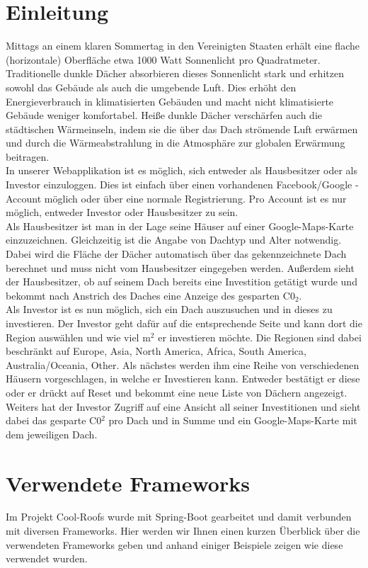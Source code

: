 \documentclass[12pt,a4paper]{article}
\begin{document}
\section{Einleitung} 
Mittags an einem klaren Sommertag in den Vereinigten Staaten erhält eine flache (horizontale) Oberfläche etwa 1000 Watt Sonnenlicht pro Quadratmeter. Traditionelle dunkle Dächer absorbieren dieses Sonnenlicht stark und erhitzen sowohl das Gebäude als auch die umgebende Luft. Dies erhöht den Energieverbrauch in klimatisierten Gebäuden und macht nicht klimatisierte Gebäude weniger komfortabel. Heiße dunkle Dächer verschärfen auch die städtischen Wärmeinseln, indem sie die über das Dach strömende Luft erwärmen und durch die Wärmeabstrahlung in die Atmosphäre zur globalen Erwärmung beitragen.\\
In unserer Webapplikation ist es möglich, sich entweder als Hausbesitzer oder als Investor einzuloggen. Dies ist einfach über einen vorhandenen Facebook/Google -Account möglich oder über eine normale Registrierung. Pro Account ist es nur möglich, entweder Investor oder Hausbesitzer zu sein.\\
Als Hausbesitzer ist man in der Lage seine Häuser auf einer Google-Maps-Karte einzuzeichnen. Gleichzeitig ist die Angabe von Dachtyp und Alter notwendig. Dabei wird die Fläche der Dächer automatisch über das gekennzeichnete Dach berechnet und muss nicht vom Hausbesitzer eingegeben werden. Außerdem sieht der Hausbesitzer, ob auf seinem Dach bereits eine Investition getätigt wurde und bekommt nach Anstrich des Daches eine Anzeige des gesparten C0$_2$.\\
Als Investor ist es nun möglich, sich ein Dach auszusuchen und in dieses zu investieren. Der Investor geht dafür auf die entsprechende Seite und kann dort die Region auswählen und wie viel m$^2$ er investieren möchte. Die Regionen sind dabei beschränkt auf Europe, Asia, North America, Africa, South America, Australia/Oceania, Other. Als nächstes werden ihm eine Reihe von verschiedenen Häusern vorgeschlagen, in welche er Investieren kann. Entweder bestätigt er diese oder er drückt auf Reset und bekommt eine neue Liste von Dächern angezeigt. Weiters hat der Investor Zugriff auf eine Ansicht all seiner Investitionen und sieht dabei das gesparte C0$^2$ pro Dach und in Summe und ein Google-Maps-Karte mit dem jeweiligen Dach.








\section{Verwendete Frameworks}
Im Projekt Cool-Roofs wurde mit Spring-Boot gearbeitet und damit verbunden mit diversen Frameworks. Hier werden wir Ihnen einen kurzen Überblick über die verwendeten Frameworks geben und anhand einiger Beispiele zeigen wie diese verwendet wurden.
\end{document}
